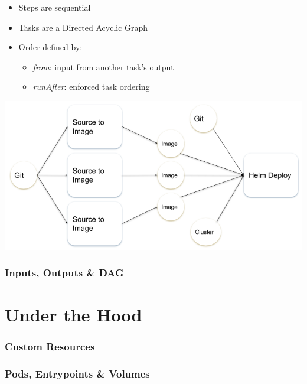 \documentclass[aspectratio=169,11pt,hyperref={colorlinks=true}]{beamer}
\begin{document}
\begin{lblackrwhiteframe}
\begin{blackframe}
\begin{2columnsframe}
  {
    \begin{itemize}
      \item Steps are sequential
      \item Tasks are a Directed Acyclic Graph
    \end{itemize}
    \vspace{10pt}
    \begin{itemize}
      \item Order defined by:
      \begin{itemize}
        \item {\em from}: input from another task's output
        \item {\em runAfter}: enforced task ordering
      \end{itemize}
    \end{itemize}
  }
  {
    \includegraphics[width=0.4\paperwidth]{img/pipeline.png}
  }
  \frametitle{Inputs, Outputs \& DAG}
\end{2columnsframe}

\section{Under the Hood}

\begin{grayframe}
  \frametitle{Custom Resources}
\end{grayframe}

\begin{grayframe}
  \frametitle{Pods, Entrypoints \& Volumes}
\end{grayframe}


\end{blackframe}
\end{lblackrwhiteframe}
\end{document}
